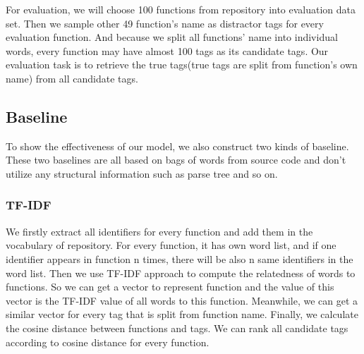 For evaluation, we will choose 100 functions from repository into evaluation data set. Then we sample other 49 function's name as distractor tags for every evaluation function. And because we split all functions' name into individual words, every function may have almost 100 tags as its candidate tags. Our evaluation task is to retrieve the true tags(true tags are split from function's own name) from all candidate tags.
\subsection{Baseline}
To show the effectiveness of our model, we also construct two kinds of baseline. These two baselines are all based on bags of words from source code and don't utilize any structural information such as parse tree and so on.
\subsubsection{TF-IDF}
We firstly extract all identifiers for every function and add them in the vocabulary of repository. For every function, it has own word list, and if one identifier appears in function n times, there will be also n same identifiers in the word list. Then we use TF-IDF approach to compute the relatedness of words to functions. So we can get a vector to represent function and the value of this vector is the TF-IDF value of all words to this function. Meanwhile, we can get a similar vector for every tag that is split from function name. Finally, we calculate the cosine distance between functions and tags. We can rank all candidate tags according to cosine distance for every function.
